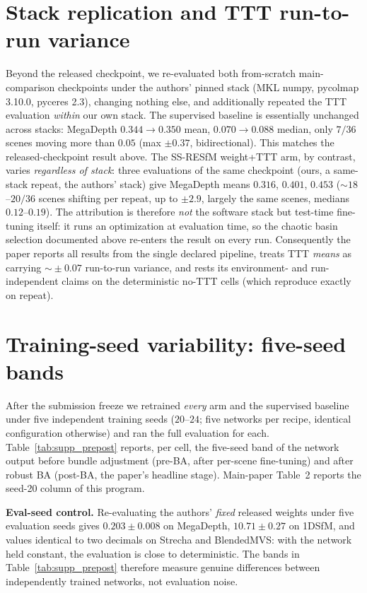 \documentclass[10pt,twocolumn,letterpaper]{article}
\begin{document}
\section{Stack replication and TTT run-to-run variance}\label{sec:ttt}
Beyond the released checkpoint, we re-evaluated both from-scratch main-comparison
checkpoints under the authors' pinned stack (MKL numpy, pycolmap 3.10.0, pyceres 2.3),
changing nothing else, and additionally repeated the TTT evaluation \emph{within} our own
stack. The supervised baseline is essentially unchanged across stacks: MegaDepth
$0.344\!\to\!0.350$ mean, $0.070\!\to\!0.088$ median, only $7/36$ scenes moving more than
$0.05$ (max $\pm0.37$, bidirectional). This matches the released-checkpoint
result above. The SS-RESfM weight+TTT arm, by contrast, varies \emph{regardless of stack}:
three evaluations of the same checkpoint (ours, a same-stack repeat, the authors' stack)
give MegaDepth means $0.316$, $0.401$, $0.453$ ($\sim\!18$--$20/36$ scenes shifting per
repeat, up to $\pm2.9$, largely the same scenes, medians $0.12$--$0.19$). The
attribution is therefore \emph{not} the software stack but test-time fine-tuning itself:
it runs an optimization at evaluation time, so the chaotic basin selection documented
above re-enters the result on every run. Consequently the paper reports all results from
the single declared pipeline, treats TTT \emph{means} as carrying $\sim\!\pm0.07$
run-to-run variance, and rests its environment- and run-independent claims on the
deterministic no-TTT cells (which reproduce exactly on repeat).

\section{Training-seed variability: five-seed bands}\label{sec:seedbands}
After the submission freeze we retrained \emph{every} arm and the supervised baseline
under five independent training seeds ($20$--$24$; five networks per recipe, identical
configuration otherwise) and ran the full evaluation for each. Table~\ref{tab:supp_prepost}
reports, per cell, the five-seed band of the network output before bundle adjustment
(pre-BA, after per-scene fine-tuning) and after robust BA (post-BA, the paper's headline
stage). Main-paper Table~2 reports the seed-20 column of this program.

\noindent\textbf{Eval-seed control.} Re-evaluating the authors' \emph{fixed} released
weights under five evaluation seeds gives $0.203\pm0.008$ on MegaDepth, $10.71\pm0.27$ on
1DSfM, and values identical to two decimals on Strecha and BlendedMVS: with the network
held constant, the evaluation is close to deterministic. The bands in
Table~\ref{tab:supp_prepost} therefore measure genuine differences between independently
trained networks, not evaluation noise.
\end{document}
